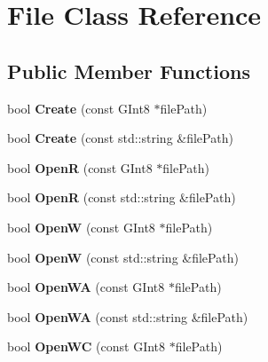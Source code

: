\hypertarget{class_file}{\section{File Class Reference}
\label{class_file}
}
\subsection*{Public Member Functions}
\begin{DoxyCompactItemize}
\item 
\hypertarget{class_file_a1d92bc8b695a86ead0223bd26b655fdc}{bool {\bfseries Create} (const G\-Int8 $\ast$file\-Path)}\label{class_file_a1d92bc8b695a86ead0223bd26b655fdc}

\item 
\hypertarget{class_file_a1509568743355190a68f3a9150f30b1a}{bool {\bfseries Create} (const std\-::string \&file\-Path)}\label{class_file_a1509568743355190a68f3a9150f30b1a}

\item 
\hypertarget{class_file_a142125c455ccabcf660351ff4f6894de}{bool {\bfseries Open\-R} (const G\-Int8 $\ast$file\-Path)}\label{class_file_a142125c455ccabcf660351ff4f6894de}

\item 
\hypertarget{class_file_a1c800f3fa587d429077d90a7c4336244}{bool {\bfseries Open\-R} (const std\-::string \&file\-Path)}\label{class_file_a1c800f3fa587d429077d90a7c4336244}

\item 
\hypertarget{class_file_af7a2d5ec7dc30bf30f1b84611d2e1837}{bool {\bfseries Open\-W} (const G\-Int8 $\ast$file\-Path)}\label{class_file_af7a2d5ec7dc30bf30f1b84611d2e1837}

\item 
\hypertarget{class_file_a735e7901c0e8187b3976344dbc8e1d4a}{bool {\bfseries Open\-W} (const std\-::string \&file\-Path)}\label{class_file_a735e7901c0e8187b3976344dbc8e1d4a}

\item 
\hypertarget{class_file_ad89bd0624f8a077d08b8d2748611b6c1}{bool {\bfseries Open\-W\-A} (const G\-Int8 $\ast$file\-Path)}\label{class_file_ad89bd0624f8a077d08b8d2748611b6c1}

\item 
\hypertarget{class_file_a3a074fdfb26ef520abbbab87b884bc0b}{bool {\bfseries Open\-W\-A} (const std\-::string \&file\-Path)}\label{class_file_a3a074fdfb26ef520abbbab87b884bc0b}

\item 
\hypertarget{class_file_ab9f08474f66ea80722137c92ff856b74}{bool {\bfseries Open\-W\-C} (const G\-Int8 $\ast$file\-Path)}\label{class_file_ab9f08474f66ea80722137c92ff856b74}


\end{DoxyCompactItemize}
